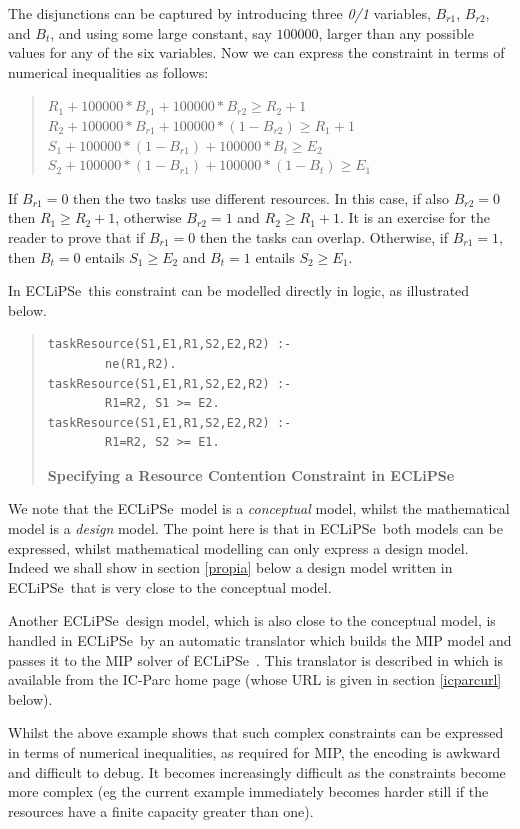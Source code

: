 \documentclass[a4wide]{article}
\newcommand{\ECL}{\mbox{ECLiPSe\ }{\hspace{1mm}}}
\begin{document}
The disjunctions can be captured by introducing three {\em 0/1} variables,
$B_{r1}$, $B_{r2}$, and $B_t$, and using some large constant, say
$100000$, larger than any possible values for any of the six variables.
Now we can express the constraint in terms of numerical inequalities as
follows:
\begin{quotation} 
$R_1 + 100000*B_{r1} + 100000*B_{r2} \geq R_2 +1$\\
$R_2 + 100000*B_{r1} + 100000*(1-B_{r2}) \geq R_1 + 1$\\
$S_1 + 100000*(1-B_{r1}) + 100000*B_t \geq E_2$\\
$S_2 + 100000*(1-B_{r1}) + 100000*(1-B_t) \geq E_1$
\end{quotation}
If $B_{r1}=0$ then the two
tasks use different resources.
In this case, if also $B_{r2}=0$ then $R_1 \geq R_2 + 1$, 
otherwise $B_{r2}=1$ and  $R_2 \geq R_1 + 1$.
It is an exercise for the reader to prove that if $B_{r1}=0$ then the
tasks can overlap. 
Otherwise, if $B_{r1}=1$, then $B_t=0$ entails $S_1 \geq E_2$ and $B_t=1$
entails $S_2 \geq E_1$.

In \ECL this constraint can be modelled directly in logic, as
illustrated below.  
\begin{quote}
\begin{verbatim}
taskResource(S1,E1,R1,S2,E2,R2) :- 
        ne(R1,R2).
taskResource(S1,E1,R1,S2,E2,R2) :-
        R1=R2, S1 >= E2.
taskResource(S1,E1,R1,S2,E2,R2) :-
        R1=R2, S2 >= E1.
\end{verbatim}
{\bf Specifying a Resource Contention Constraint in \ECL}
\label{nooverlap}
\end{quote} 

We note that the \ECL model is a {\em conceptual} model, whilst the
mathematical model is a {\em design} model.
The point here is that in \ECL both models can be expressed, whilst
mathematical modelling can only express a design model.
Indeed we shall show in section \ref{propia} below a design model
written in \ECL that is very close to the conceptual model.

Another \ECL design model, which is also close to the conceptual
model, is handled in \ECL by an automatic translator which  builds the
MIP model  
and passes it to the MIP solver of \ECL.
This translator is described in \cite{clpmip} which is available from
the IC-Parc 
home page (whose URL is given in section \ref{icparcurl} below).

Whilst the above example shows that such complex constraints can be
expressed in terms of numerical inequalities, as required for MIP, the
encoding is awkward and difficult to debug. 
It becomes increasingly difficult as the constraints become more
complex (eg the current example immediately becomes harder still if the
resources have a finite capacity greater than one).
\end{document}
